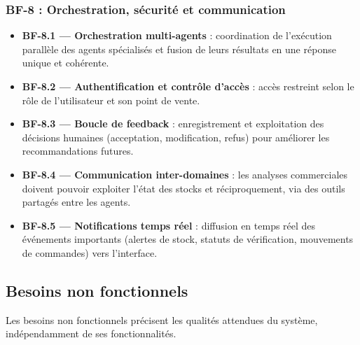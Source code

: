 \subsubsection*{BF-8 : Orchestration, sécurité et communication}
\begin{itemize}[label=--]
    \item \textbf{BF-8.1 — Orchestration multi-agents} : coordination de l'exécution parallèle des agents spécialisés et fusion de leurs résultats en une réponse unique et cohérente.
    \item \textbf{BF-8.2 — Authentification et contrôle d'accès} : accès restreint selon le rôle de l'utilisateur et son point de vente.
    \item \textbf{BF-8.3 — Boucle de feedback} : enregistrement et exploitation des décisions humaines (acceptation, modification, refus) pour améliorer les recommandations futures.
    \item \textbf{BF-8.4 — Communication inter-domaines} : les analyses commerciales doivent pouvoir exploiter l'état des stocks et réciproquement, via des outils partagés entre les agents.
    \item \textbf{BF-8.5 — Notifications temps réel} : diffusion en temps réel des événements importants (alertes de stock, statuts de vérification, mouvements de commandes) vers l'interface.
\end{itemize}

\subsection{Besoins non fonctionnels}

Les besoins non fonctionnels précisent les qualités attendues du système, indépendamment de ses fonctionnalités.

